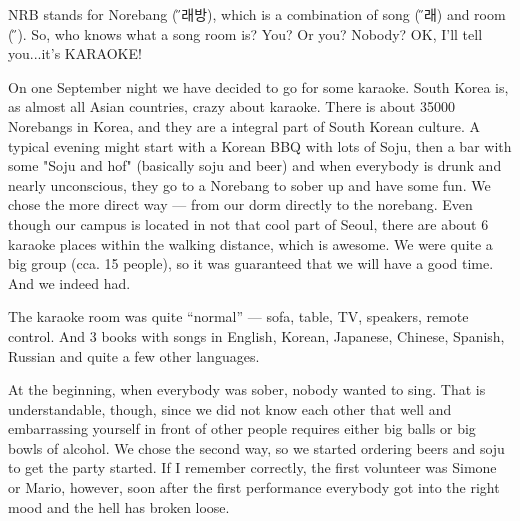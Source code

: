 \begin{post}
	\begin{content}
NRB stands for Norebang ({\H 노래방}), which is a combination of song ({\H 노래}) and room ({\H 방}). So, who knows what a song room is? You? Or you? Nobody? OK, I'll tell you...it's KARAOKE!

On one September night we have decided to go for some karaoke. South Korea is, as almost all Asian countries, crazy about karaoke. There is about 35000 Norebangs in Korea, and they are a integral part of South Korean culture. A typical evening might start with a Korean BBQ with lots of Soju, then a bar with some "Soju and hof" (basically soju and beer) and when everybody is drunk and nearly unconscious, they go to a Norebang to sober up and have some fun. We chose the more direct way — from our dorm directly to the norebang. Even though our campus is located in not that cool part of Seoul, there are about 6 karaoke places within the walking distance, which is awesome. We were quite a big group (cca. 15 people), so it was guaranteed that we will have a good time. And we indeed had.


The karaoke room was quite ``normal'' --- sofa, table, TV, speakers, remote control. And 3 books with songs in English, Korean, Japanese, Chinese, Spanish, Russian and quite a few other languages.

At the beginning, when everybody was sober, nobody wanted to sing. That is understandable, though, since we did not know each other that well and embarrassing yourself in front of other people requires either big balls or big bowls of alcohol. We chose the second way, so we started ordering beers and soju to get the party started. If I remember correctly, the first volunteer was Simone or Mario, however, soon after the first performance everybody got into the right mood and the hell has broken loose.



\end{content}
\end{post}
